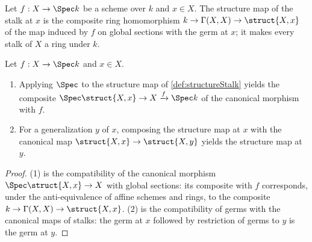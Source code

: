 \begin{definition}
  \label{def:structureStalk}
  \leanok
  Let \(f : X \to \Spec k\) be a scheme over \(k\) and \(x \in X\). The structure map of
  the stalk at \(x\) is the composite ring homomorphism
  \(k \to \Gamma(X, X) \to \struct{X,x}\) of the map induced by \(f\) on global sections
  with the germ at \(x\); it makes every stalk of \(X\) a ring under \(k\).
\end{definition}

\begin{lemma}
  \label{lem:structureStalk_coherence}
  \leanok
  Let \(f : X \to \Spec k\) and \(x \in X\).
  \begin{enumerate}
    \item Applying \(\Spec\) to the structure map of \ref{def:structureStalk} yields the
      composite \(\Spec \struct{X,x} \to X \xrightarrow{f} \Spec k\) of the canonical
      morphism with \(f\).
    \item For a generalization \(y\) of \(x\), composing the structure map at \(x\) with
      the canonical map \(\struct{X,x} \to \struct{X,y}\) yields the structure map at
      \(y\).
  \end{enumerate}
\end{lemma}
\begin{proof}
  \leanok
  (1) is the compatibility of the canonical morphism \(\Spec \struct{X,x} \to X\) with
  global sections: its composite with \(f\) corresponds, under the anti-equivalence of
  affine schemes and rings, to the composite \(k \to \Gamma(X, X) \to \struct{X,x}\).
  (2) is the compatibility of germs with the canonical maps of stalks: the germ at \(x\)
  followed by restriction of germs to \(y\) is the germ at \(y\).
\end{proof}

